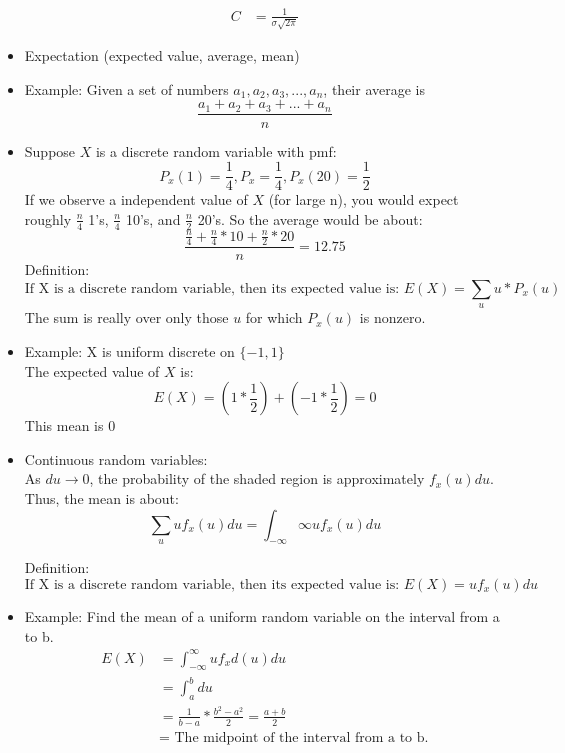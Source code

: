 \documentclass[10pt]{article}
\begin{document}
\begin{flushleft}
\begin{itemize}
$$\begin{aligned}
            C &= \frac{1}{\sigma \sqrt{2\pi}}
        \end{aligned} $$
    \item Expectation (expected value, average, mean)
    \item Example: Given a set of numbers $a_1, a_2, a_3, ..., a_n$, their
        average is $$ \frac{a_1 + a_2 + a_3 + ... + a_n }{n} $$
    \item Suppose $X$ is a discrete random variable with pmf:
        $$ P_x(1) = \frac{1}{4}, P_x = \frac{1}{4}, P_x(20) = \frac{1}{2} $$
        If we observe a independent value of $X$ (for large n), you would expect
        roughly $\frac{n}{4}$ 1's, $\frac{n}{4}$ 10's, and $\frac{n}{2}$ 20's.
        So the average would be about:
        $$ \frac{\frac{n}{4} + \frac{n}{4} * 10 + \frac{n}{2} * 20 }{n} = 12.75$$
        Definition:
        $$ \boxed{ \text{If X is a discrete random variable, then its
        expected value is: } E(X) = \sum_u u * P_x(u) } $$
        The sum is really over only those $u$ for which $P_x(u)$ is nonzero.
    \item Example: X is uniform discrete on $\{ -1, 1 \}$ \\
        The expected value of $X$ is:
        $$ E(X) = (1 * \frac{1}{2}) + (-1 * \frac{1}{2}) = 0$$
        This mean is 0
    \item Continuous random variables: \\
        As $du \rightarrow 0$, the probability of the shaded region is
        approximately $f_x(u)du$. Thus, the mean is about:
        $$ \sum_u u f_x(u)du = \int_{-\infty}{\infty} u f_x(u) du $$

        Definition:
        $$ \boxed{ \text{If X is a discrete random variable, then its
        expected value is: } E(X) = u f_x(u) du } $$
    \item Example: Find the mean of a uniform random variable on the interval
        from a to b. \\
        $$ \begin{aligned}
            E(X) &= \int_{-\infty}^{\infty} u f_xd(u) du \\
                 &= \int_{a}^{b} du \\
                 &= \frac{1}{b - a} * \frac{b^2 - a^2}{2} = \frac{a + b}{2} \\
                 &= \text{ The midpoint of the interval from a to b.}
        \end{aligned}$$


\end{itemize}
\end{flushleft}
\end{document}
